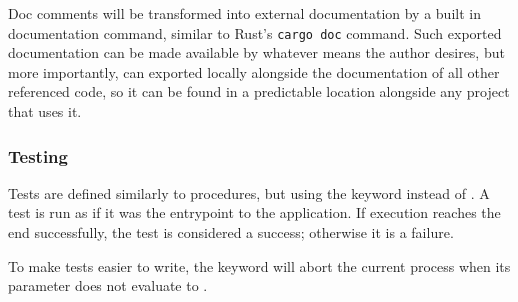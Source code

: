 Doc comments will be transformed into external documentation by a built
in documentation command, similar to Rust's \texttt{cargo doc} command.
Such exported documentation can be made available by whatever means the
author desires, but more importantly, can exported locally alongside the
documentation of all other referenced code, so it can be found in a
predictable location alongside any project that uses it.

\subsubsection{Testing}

Tests are defined similarly to procedures, but using the keyword 
instead of . A test is run as if it was the entrypoint to the
application. If execution reaches the end successfully, the test is
considered a success; otherwise it is a failure.


To make tests easier to write, the  keyword will abort the
current process when its parameter does not evaluate to .
